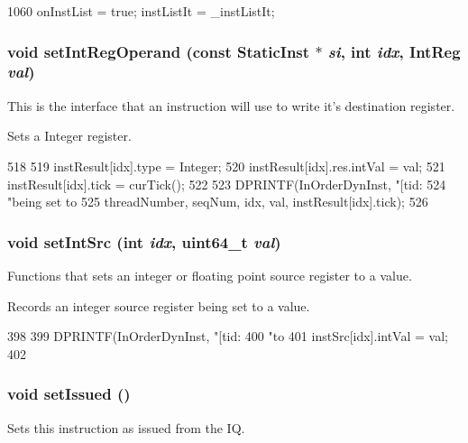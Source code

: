 \begin{DoxyCode}
1060 { onInstList = true; instListIt = _instListIt; }
\end{DoxyCode}
\hypertarget{classInOrderDynInst_a2261caa4a6bc09599abc8950215d2e97}{
\subsubsection[{setIntRegOperand}]{\setlength{\rightskip}{0pt plus 5cm}void setIntRegOperand (const {\bf StaticInst} $\ast$ {\em si}, \/  int {\em idx}, \/  {\bf IntReg} {\em val})}}
\label{classInOrderDynInst_a2261caa4a6bc09599abc8950215d2e97}
This is the interface that an instruction will use to write it's destination register.

Sets a Integer register. 


\begin{DoxyCode}
518 {
519     instResult[idx].type = Integer;
520     instResult[idx].res.intVal = val;
521     instResult[idx].tick = curTick();
522 
523     DPRINTF(InOrderDynInst, "[tid:%
524             "being set to %
525             threadNumber, seqNum, idx, val, instResult[idx].tick);
526 }
\end{DoxyCode}
\hypertarget{classInOrderDynInst_aeb30df1baf9f60e687deeb0ae66ed130}{
\subsubsection[{setIntSrc}]{\setlength{\rightskip}{0pt plus 5cm}void setIntSrc (int {\em idx}, \/  uint64\_\-t {\em val})}}
\label{classInOrderDynInst_aeb30df1baf9f60e687deeb0ae66ed130}
Functions that sets an integer or floating point source register to a value.

Records an integer source register being set to a value. 


\begin{DoxyCode}
398 {
399     DPRINTF(InOrderDynInst, "[tid:%
400             "to %
401     instSrc[idx].intVal = val;
402 }
\end{DoxyCode}
\hypertarget{classInOrderDynInst_a04eb3fc23b5c2e74dc6d12afc25f0198}{
\subsubsection[{setIssued}]{\setlength{\rightskip}{0pt plus 5cm}void setIssued ()}}
\label{classInOrderDynInst_a04eb3fc23b5c2e74dc6d12afc25f0198}
Sets this instruction as issued from the IQ. 


